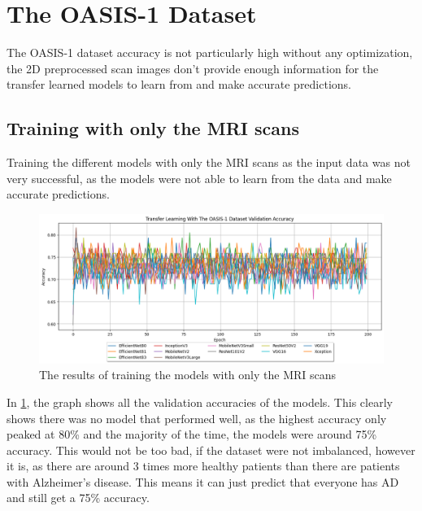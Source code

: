\documentclass[]{final_report}
\begin{document}
\section{The OASIS-1 Dataset}

The OASIS-1 dataset accuracy is not particularly high without any optimization, the 2D preprocessed scan images don't provide enough information for the transfer learned models to learn from and make accurate predictions.

\subsection{Training with only the MRI scans}

Training the different models with only the MRI scans as the input data was not very successful, as the models were not able to learn from the data and make accurate predictions. 

\begin{figure}[ht!]
  \centering
  \includegraphics[width=1\textwidth]{images/OASIS-1-Transfer-Learning-Basic-Results.png}
  \caption{The results of training the models with only the MRI scans}
  \label{fig:OASIS-1-Transfer-Learning-Basic-Results-Accuracy}
\end{figure}

In \ref{fig:OASIS-1-Transfer-Learning-Basic-Results-Accuracy}, the graph shows all the validation accuracies of the models. This clearly shows there was no model that performed well, as the highest accuracy only peaked at 80\% and the majority of the time, the models were around 75\% accuracy. This would not be too bad, if the dataset were not imbalanced, however it is, as there are around 3 times more healthy patients than there are patients with Alzheimer's disease. This means it can just predict that everyone has AD and still get a 75\% accuracy.
\end{document}
